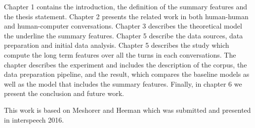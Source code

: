 Chapter 1 contains the introduction, the definition of the summary features and the thesis statement. Chapter 2 presents the related work in both human-human and human-computer conversations. Chapter 3 describes the theoretical model the underline the summary features. Chapter 5 describe the data sources, data preparation and initial data analysis. Chapter 5 describes the study which compute the long term features over all the turns in each conversations. The chapter describes the experiment and includes the description of the corpus, the data preparation pipeline, and the result, which compares the baseline models as well as the model that includes the summary features. Finally, in chapter 6 we present the conclusion and future work.


This work is based on Meshorer and Heeman \cite{Meshorer2016UsingPS} which was submitted and presented in interspeech 2016.
